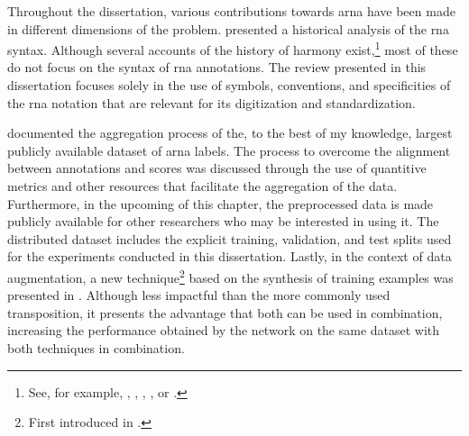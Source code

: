 
Throughout the dissertation, various contributions towards
\gls{arna} have been made in different dimensions of the
problem. 
presented a historical analysis of the \gls{rna} syntax.
Although several accounts of the history of harmony
exist,\footnote{See, for example,
\textcite{wason1985viennese}, \textcite{grave1988praise},
\textcite{christensen2002tonality},
\textcite{laitz2010graduate}, or
\textcite{sansallovich2013quintas}.} most of these do not
focus on the syntax of \gls{rna} annotations. The review
presented in this dissertation focuses solely in the use of
symbols, conventions, and specificities of the \gls{rna}
notation that are relevant for its digitization and
standardization.

 documented the
aggregation process of the, to the best of my knowledge,
largest publicly available dataset of \gls{arna} labels. The
process to overcome the alignment between annotations and
scores was discussed through the use of quantitive metrics
and other resources that facilitate the aggregation of the
data. Furthermore, in the upcoming
 of this chapter, the
preprocessed data is made publicly available for other
researchers who may be interested in using it. The
distributed dataset includes the explicit training,
validation, and test splits used for the experiments
conducted in this dissertation. Lastly, in the context of
data augmentation, a new technique\footnote{First introduced
in \textcite{napoleslopez2021augmentednet}.} based on the
synthesis of training examples was presented in
. Although
less impactful than the more commonly used transposition, it
presents the advantage that both can be used in combination,
increasing the performance obtained by the network on the
same dataset with both techniques in combination.

